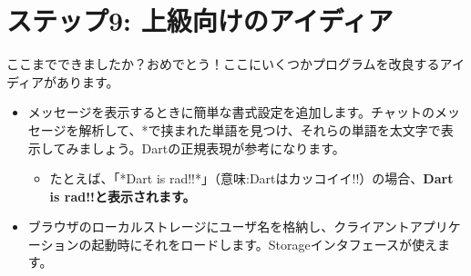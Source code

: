 \section{ステップ9: 上級向けのアイディア}

ここまでできましたか？おめでとう！ここにいくつかプログラムを改良するアイディアがあります。

\begin{itemize}
\item メッセージを表示するときに簡単な書式設定を追加します。チャットのメッセージを解析して、*で挟まれた単語を見つけ、それらの単語を太文字で表示してみましょう。Dartの正規表現が参考になります。
\begin{itemize}
\item たとえば、「*Dart is rad!!*」（意味:Dartはカッコイイ!!）の場合、\bfseries{Dart is rad!!}と表示されます。
\end{itemize}
\item ブラウザのローカルストレージにユーザ名を格納し、クライアントアプリケーションの起動時にそれをロードします。Storageインタフェースが使えます。
\end{itemize}